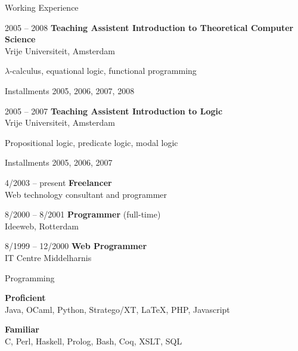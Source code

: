 \documentclass[a4paper,11pt]{article}
\newenvironment{sublist}{%
  \begin{list}{}{%
      \setlength{\itemsep}{0em}\setlength{\parsep}{0em}%
      \setlength{\topsep}{0em}\setlength{\parskip}{0em}%
    }%
}%
{ \end{list} }
\begin{document}
\begin{cv}{}
\begin{cvlist}{Working Experience}
\item[2005 -- 2008]
  {\bf Teaching Assistent Introduction to Theoretical Computer Science}\\
  Vrije Universiteit, Amsterdam
  \begin{sublist}
  \item $\lambda$-calculus, equational logic, functional programming
  \item Installments 2005, 2006, 2007, 2008
  \end{sublist}
\item[2005 -- 2007]
  {\bf Teaching Assistent Introduction to Logic}\\
  Vrije Universiteit, Amsterdam
  \begin{sublist}
  \item Propositional logic, predicate logic, modal logic
  \item Installments 2005, 2006, 2007
  \end{sublist}
\item[4/2003 -- present]
  {\bf Freelancer}\\
  Web technology consultant and programmer
\item[8/2000 -- 8/2001]
  {\bf Programmer} (full-time)\\
  Ideeweb, Rotterdam
\item[8/1999 -- 12/2000]
  {\bf Web Programmer}\\
  IT Centre Middelharnis
\end{cvlist}




\pagebreak


\begin{cvlist}{Programming}
\item
  {\bf Proficient}\\
  Java, OCaml, Python, Stratego/XT, LaTeX, PHP, Javascript
\item
  {\bf Familiar}\\
  C, Perl, Haskell, Prolog, Bash, Coq, XSLT, SQL
\end{cvlist}



\end{cv}
\end{document}
